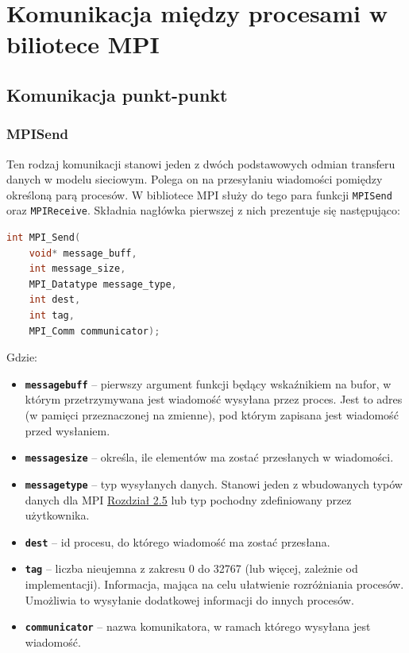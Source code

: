 \section{Komunikacja między procesami w biliotece MPI}

\subsection{Komunikacja punkt-punkt}

\subsubsection{MPI\textunderscore Send}
Ten rodzaj komunikacji stanowi jeden z dwóch podstawowych odmian transferu danych w modelu sieciowym. Polega on na przesyłaniu wiadomości pomiędzy określoną parą procesów. W bibliotece MPI służy do tego para funkcji \texttt{MPI\textunderscore Send} oraz \texttt{MPI\textunderscore Receive}. Składnia nagłówka pierwszej z nich prezentuje się następująco: 
\begin{lstlisting}[language=C]
int MPI_Send(
	void* message_buff,
	int message_size,
	MPI_Datatype message_type,
	int dest,
	int tag,
	MPI_Comm communicator);
\end{lstlisting}

Gdzie:
\begin{itemize}
	\item \texttt{\textbf{message\textunderscore buff}} -- pierwszy argument funkcji będący wskaźnikiem na bufor, w którym przetrzymywana jest wiadomość wysyłana przez proces. Jest to adres (w pamięci przeznaczonej na zmienne), pod którym zapisana jest wiadomość przed wysłaniem.
	\item \texttt{\textbf{message\textunderscore size}} -- określa, ile elementów ma zostać przesłanych w wiadomości.
	\item \texttt{\textbf{message\textunderscore type}} -- typ wysyłanych danych. Stanowi jeden z wbudowanych typów danych dla MPI \hyperref[table:datatypes]{Rozdział 2.5} lub typ pochodny zdefiniowany przez użytkownika.
	\item \texttt{\textbf{dest}} -- id procesu, do którego wiadomość ma zostać przesłana.
	\item \texttt{\textbf{tag}} -- liczba nieujemna z zakresu 0 do 32767 (lub więcej, zależnie od implementacji). Informacja, mająca na celu ułatwienie rozróżniania procesów. Umożliwia to wysyłanie dodatkowej informacji do innych procesów.
	\item \texttt{\textbf{communicator}} -- nazwa komunikatora, w ramach którego wysyłana jest wiadomość.
\end{itemize}

